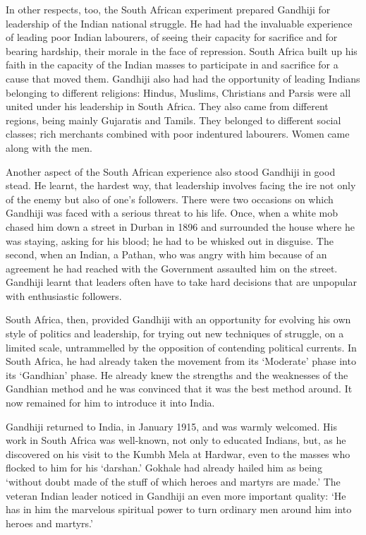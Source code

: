 In other respects, too, the South African experiment prepared Gandhiji for leadership of the Indian national struggle. He had had the invaluable experience of leading poor Indian labourers, of seeing their capacity for sacrifice and for bearing hardship, their morale in the face of repression. South Africa built up his faith in the capacity of the Indian masses to participate in and sacrifice for a cause that moved them. Gandhiji also had had the opportunity of leading Indians belonging to different religions: Hindus, Muslims, Christians and Parsis were all united under his leadership in South Africa. They also came from different regions, being mainly Gujaratis and Tamils. They belonged to different social classes; rich merchants combined with poor indentured labourers. Women came along with the men.

Another aspect of the South African experience also stood Gandhiji in good stead. He learnt, the hardest way, that leadership involves facing the ire not only of the enemy but also of one's followers. There were two occasions on which Gandhiji was faced with a serious threat to his life. Once, when a white mob chased him down a street in Durban in 1896 and surrounded the house where he was staying, asking for his blood; he had to be whisked out in disguise. The second, when an Indian, a Pathan, who was angry with him because of an agreement he had reached with the Government assaulted him on the street. Gandhiji learnt that leaders often have to take hard decisions that are unpopular with enthusiastic followers.

South Africa, then, provided Gandhiji with an opportunity for evolving his own style of politics and leadership, for trying out new techniques of struggle, on a limited scale, untrammelled by the opposition of contending political currents. In South Africa, he had already taken the movement from its `Moderate' phase into its `Gandhian' phase. He already knew the strengths and the weaknesses of the Gandhian method and he was convinced that it was the best method around. It now remained for him to introduce it into India.

Gandhiji returned to India, in January 1915, and was warmly welcomed. His work in South Africa was well-known, not only to educated Indians, but, as he discovered on his visit to the Kumbh Mela at Hardwar, even to the masses who flocked to him for his `darshan.' Gokhale had already hailed him as being `without doubt made of the stuff of which heroes and martyrs are made.' The veteran Indian leader noticed in Gandhiji an even more important quality: `He has in him the marvelous spiritual power to turn ordinary men around him into heroes and martyrs.'

